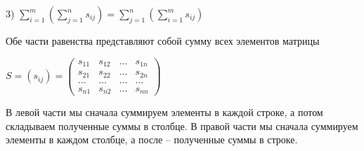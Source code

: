 \vspace{\baselineskip}
3) $\sum\limits_{i=1}^m ( \sum\limits_{j=1}^n s_{ij}) = \sum\limits_{j=1}^n ( \sum\limits_{i=1}^m s_{ij})$

Обе части равенства представляют собой сумму всех элементов матрицы 

$S = (s_{ij}) = \begin{pmatrix} s_{11} & s_{12} & \dots & s_{1n} \\
s_{21} & s_{22} & \dots & s_{2n} \\
\dots & \dots & \dots & \dots \\
s_{n1} & s_{n2} & \dots & s_{nn} \end{pmatrix}$ 

\vspace{\baselineskip}
В левой части мы сначала суммируем элементы в каждой строке, а потом складываем полученные суммы в столбце. В правой части мы сначала суммируем элементы в каждом столбце, а после -- полученные суммы в строке.

